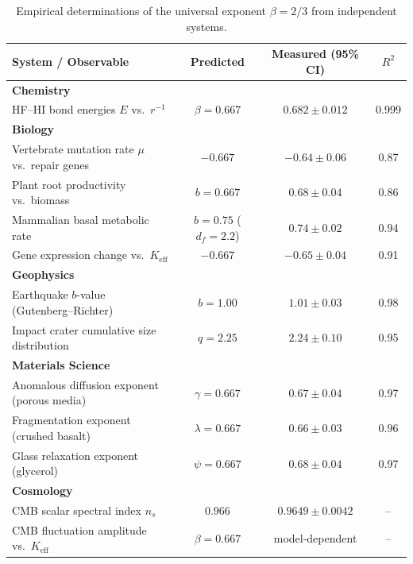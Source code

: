 \documentclass[12pt,a4paper]{article}
\begin{document}
		\begin{table}[H]
			\centering
			\caption{Empirical determinations of the universal exponent \(\beta = 2/3\) from independent systems.}
			\label{tab:empirical-beta}
			\small
			\begin{tabular}{lccc}
				\toprule
				\textbf{System / Observable} & \textbf{Predicted} & \textbf{Measured (95\% CI)} & \(R^2\) \\
				\midrule
				\textbf{Chemistry} & & & \\
				\quad HF–HI bond energies \(E\) vs.\ \(r^{-1}\) & \(\beta = 0.667\) & \(0.682 \pm 0.012\) & 0.999 \\
				\textbf{Biology} & & & \\
				\quad Vertebrate mutation rate \(\mu\) vs.\ repair genes & \(-0.667\) & \(-0.64 \pm 0.06\) & 0.87 \\
				\quad Plant root productivity vs.\ biomass & \(b = 0.667\) & \(0.68 \pm 0.04\) & 0.86 \\
				\quad Mammalian basal metabolic rate & \(b = 0.75\) (\(d_f=2.2\)) & \(0.74 \pm 0.02\) & 0.94 \\
				\quad Gene expression change vs.\ \(K_{\mathrm{eff}}\) & \(-0.667\) & \(-0.65 \pm 0.04\) & 0.91 \\
				\textbf{Geophysics} & & & \\
				\quad Earthquake \(b\)-value (Gutenberg–Richter) & \(b = 1.00\) & \(1.01 \pm 0.03\) & 0.98 \\
				\quad Impact crater cumulative size distribution & \(q = 2.25\) & \(2.24 \pm 0.10\) & 0.95 \\
				\textbf{Materials Science} & & & \\
				\quad Anomalous diffusion exponent (porous media) & \(\gamma = 0.667\) & \(0.67 \pm 0.04\) & 0.97 \\
				\quad Fragmentation exponent (crushed basalt) & \(\lambda = 0.667\) & \(0.66 \pm 0.03\) & 0.96 \\
				\quad Glass relaxation exponent (glycerol) & \(\psi = 0.667\) & \(0.68 \pm 0.04\) & 0.97 \\
				\textbf{Cosmology} & & & \\
				\quad CMB scalar spectral index \(n_s\) & \(0.966\) & \(0.9649 \pm 0.0042\) & -- \\
				\quad CMB fluctuation amplitude vs.\ \(K_{\mathrm{eff}}\) & \(\beta = 0.667\) & model‑dependent & -- \\
				\bottomrule
			\end{tabular}
		\end{table}
		
\end{document}
